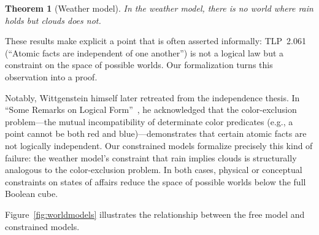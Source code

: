 \documentclass[10pt, letterpaper]{article}
\newtheorem{theorem}{Theorem}[section]
\theoremstyle{definition}
\theoremstyle{remark}
\begin{document}
\begin{theorem}[Weather model]
\label{thm:weather}
In the weather model, there is no world where rain holds but
clouds does not.
\end{theorem}

\noindent
These results make explicit a point that is often asserted
informally: TLP~2.061 (``Atomic facts are independent of one
another'') is not a logical law but a constraint on the space of
possible worlds.  Our formalization turns this observation into a
proof.

Notably, Wittgenstein himself later retreated from the
independence thesis.  In ``Some Remarks on Logical
Form''~\cite{wittgenstein1929}, he acknowledged that the
color-exclusion problem---the mutual incompatibility of
determinate color predicates (e.g., a point cannot be both red
and blue)---demonstrates that certain atomic facts are not
logically independent.  Our constrained models formalize
precisely this kind of failure: the weather model's constraint
that rain implies clouds is structurally analogous to the
color-exclusion problem.  In both cases, physical or conceptual
constraints on states of affairs reduce the space of possible
worlds below the full Boolean cube.

Figure~\ref{fig:worldmodels} illustrates the relationship
between the free model and constrained models.
\end{document}
